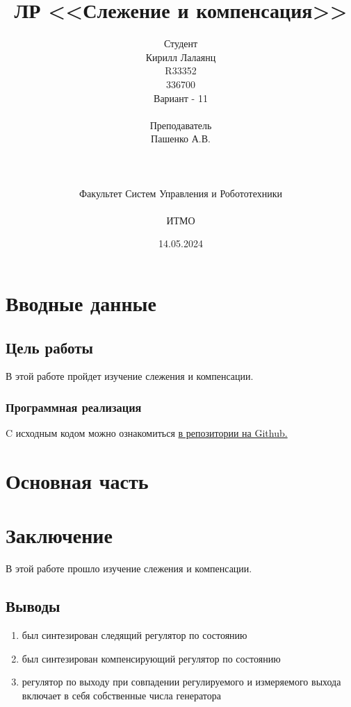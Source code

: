 \documentclass[16pt]{article}
\title{ЛР \textnumero 12 <<Слежение и компенсация>>}
\author{
Студент \\
Кирилл Лалаянц\\
R33352\\
336700\\
Вариант - 11\\
\\
Преподаватель\\
Пашенко А.В. \\
\\
\\
\\
Факультет Систем Управления и Робототехники\\
\\
ИТМО\\
}
\date{14.05.2024}
\begin{document}
\maketitle
\newpage
\tableofcontents
\thispagestyle{empty}

\newpage
\setcounter{page}{1}
\section{Вводные данные}
\subsection{Цель работы}
В этой работе пройдет изучение слежения и компенсации.

\subsubsection{Программная реализация}
C исходным кодом можно ознакомиться \href{https://github.com/lalayants/control-theory-itmo-2023-2024}{в репозитории на Github.}


\newpage
\section{Основная часть}

\FloatBarrier


\FloatBarrier


\FloatBarrier


\FloatBarrier

% 

\newpage
\section{Заключение}
В этой работе прошло изучение слежения и компенсации.
\subsection{Выводы}
\begin{enumerate}
   \item был синтезирован следящий регулятор по состоянию
   \item был синтезирован компенсирующий регулятор по состоянию
   \item регулятор по выходу при совпадении регулируемого и измеряемого выхода включает в себя собственные числа генератора
\end{enumerate}
\end{document}
